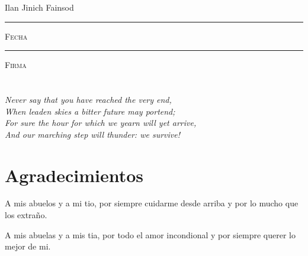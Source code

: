 \documentclass[11pt]{book}
\begin{document}
\centering

\hspace{3em}

Ilan Jinich Fainsod

\vspace{5em}

\rule[1em]{20em}{0.5pt} %

\textsc{Fecha}
 
\vspace{8em}

\rule[1em]{20em}{0.5pt} %

\textsc{Firma}

\endgroup
\vspace*{\fill}



\pagestyle{empty}
\frontmatter

\chapter*{}
\begin{flushright}
\textit{ Never say that you have reached the very end, \\
When leaden skies a bitter future may portend; \\
For sure the hour for which we yearn will yet arrive, \\
And our marching step will thunder: we survive!}
\end{flushright}



\chapter*{Agradecimientos}
%
A mis abuelos y a mi tio, por siempre cuidarme desde arriba y por lo mucho que los extraño.

A mis abuelas y a mis tia, por todo el amor incondional y por siempre querer lo mejor de mi.
\end{document}
